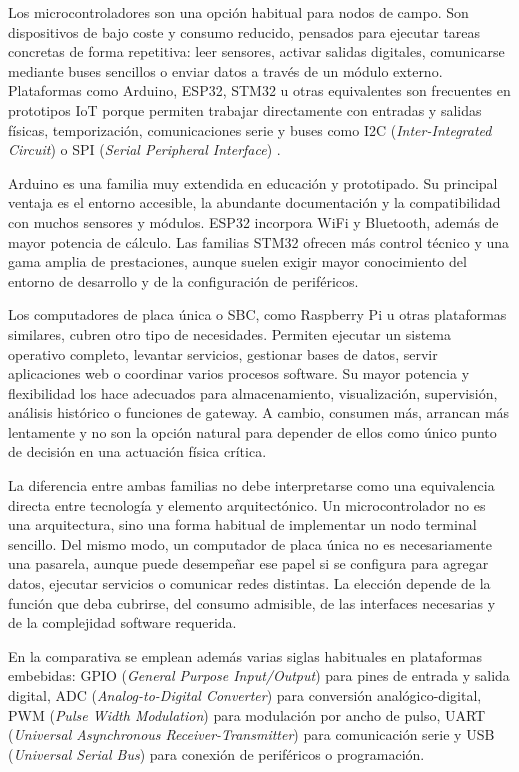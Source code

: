 Los microcontroladores son una opción habitual para nodos de campo. Son dispositivos de bajo coste y consumo reducido, pensados para ejecutar tareas concretas de forma repetitiva: leer sensores, activar salidas digitales, comunicarse mediante buses sencillos o enviar datos a través de un módulo externo. Plataformas como Arduino, ESP32, STM32 u otras equivalentes son frecuentes en prototipos IoT porque permiten trabajar directamente con entradas y salidas físicas, temporización, comunicaciones serie y buses como I2C (\textit{Inter-Integrated Circuit}) o SPI (\textit{Serial Peripheral Interface}) \cite{alFuqaha2015iot}.

Arduino es una familia muy extendida en educación y prototipado. Su principal ventaja es el entorno accesible, la abundante documentación y la compatibilidad con muchos sensores y módulos. ESP32 incorpora WiFi y Bluetooth, además de mayor potencia de cálculo. Las familias STM32 ofrecen más control técnico y una gama amplia de prestaciones, aunque suelen exigir mayor conocimiento del entorno de desarrollo y de la configuración de periféricos.

Los computadores de placa única o SBC, como Raspberry Pi u otras plataformas similares, cubren otro tipo de necesidades. Permiten ejecutar un sistema operativo completo, levantar servicios, gestionar bases de datos, servir aplicaciones web o coordinar varios procesos software. Su mayor potencia y flexibilidad los hace adecuados para almacenamiento, visualización, supervisión, análisis histórico o funciones de gateway. A cambio, consumen más, arrancan más lentamente y no son la opción natural para depender de ellos como único punto de decisión en una actuación física crítica.

La diferencia entre ambas familias no debe interpretarse como una equivalencia directa entre tecnología y elemento arquitectónico. Un microcontrolador no es una arquitectura, sino una forma habitual de implementar un nodo terminal sencillo. Del mismo modo, un computador de placa única no es necesariamente una pasarela, aunque puede desempeñar ese papel si se configura para agregar datos, ejecutar servicios o comunicar redes distintas. La elección depende de la función que deba cubrirse, del consumo admisible, de las interfaces necesarias y de la complejidad software requerida.

En la comparativa se emplean además varias siglas habituales en plataformas embebidas: GPIO (\textit{General Purpose Input/Output}) para pines de entrada y salida digital, ADC (\textit{Analog-to-Digital Converter}) para conversión analógico-digital, PWM (\textit{Pulse Width Modulation}) para modulación por ancho de pulso, UART (\textit{Universal Asynchronous Receiver-Transmitter}) para comunicación serie y USB (\textit{Universal Serial Bus}) para conexión de periféricos o programación.

